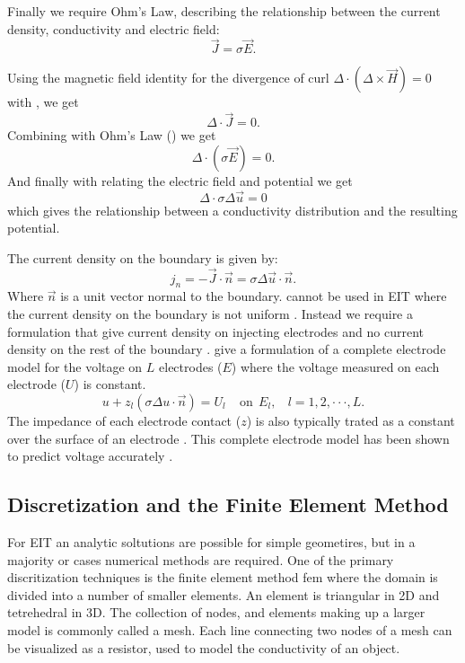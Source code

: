 Finally we require Ohm's Law, describing the relationship between the current density,
conductivity and electric field:
\begin{equation} \label{eq:ohm}
	\vec{J} = \sigma \vec{E}.
\end{equation}

Using the magnetic field identity for the divergence of curl 
$ \Delta \cdot (\Delta \times \vec{H}) = 0 $ with , we get
\begin{equation} \label{eq:mid1}
	\Delta \cdot \vec{J} = 0.
\end{equation}
Combining  with Ohm's Law () we get 
\begin{equation} \label{eq:mid2}
	\Delta \cdot (\sigma \vec{E}) = 0.
\end{equation}
And finally with  relating the electric field and potential 
we get 
\begin{equation}
	\Delta \cdot \sigma \Delta \vec{u} = 0
\end{equation}
which gives the relationship between a conductivity distribution and the resulting 
potential. 


The current density on the boundary is given by:
\begin{equation} \label{eq:cur_den}
	j_n = -\vec{J} \cdot \vec{n}  = \sigma \Delta \vec{u} \cdot \vec{n}.
\end{equation}
Where $\vec{n}$ is a unit vector normal to the boundary.  cannot be 
used in EIT where the current density on the boundary is not 
uniform \parencite{somersalo_existence_1992}. Instead
we require a formulation that give current density on injecting electrodes 
and no current density on the rest of the boundary \parencite{somersalo_existence_1992}.
 give 
a formulation of a complete electrode model for the voltage on $L$ electrodes ($E$)
where the voltage measured on each electrode ($U$) is constant. 
\begin{equation} \label{eq:comp_elec}
	u + z_l (\sigma \Delta u \cdot \vec{n}) = U_l ~~~~~ \text{on} ~~ E_l, ~~~~ l= 1,2,\cdot\cdot\cdot,L.
\end{equation}
The impedance of each electrode contact ($z$) is also typically trated as a constant over the surface of 
an electrode \parencite{somersalo_existence_1992}.
This complete electrode model has been shown to predict voltage accurately \parencite{somersalo_existence_1992}.

\subsection{Discretization and the Finite Element Method}
For EIT an analytic soltutions are possible for simple geometires, but in a majority or cases
numerical methods are required. 
One of the primary discritization techniques is the finite element method \acrshort{fem}
where the domain is divided into a number of smaller elements. 
An element is
triangular in 2D and tetrehedral in 3D. 
The collection of nodes, and elements making up a larger model is commonly called a mesh. 
Each line connecting two nodes of a mesh can be visualized as a resistor,
used to model the conductivity of an object.

